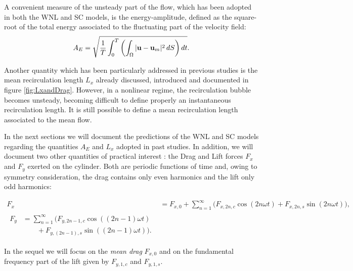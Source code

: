 \documentclass[twocolumn,10pt]{asme2ej}
\newcommand{\be}[1]{ \begin{equation} \label{#1}}
\newcommand{\ee}{\end{equation}}
\begin{document}
A convenient measure of the unsteady part of the flow, which has been adopted in both the WNL and SC models, is the energy-amplitude, defined as the square-root of the total energy associated to the fluctuating part of the velocity field:
\be{defAnergy}
A_E = \sqrt{\frac{1}{T} \int_0^{T} \left( \int_\Omega | {\bf u} - {\bf u}_m |^2 \, dS \right) dt}.
\ee

Another quantity which has been particularly addressed in previous studies is the mean recirculation length $L_x$
already discussed{\color{red},} introduced and {\color{red}documented in figure \ref{fig:LxandDrag}}. {\color{red} However, in a} nonlinear regime, the recirculation bubble becomes unsteady, {\color{red} becoming} difficult to define properly an instantaneous recirculation length. It is still possible to define a mean recirculation length associated to the mean flow. %

In the next sections we will document the predictions of the WNL and SC models regarding the quantities $A_E$ and $L_x$ adopted in past studies. In addition, we will document two other quantities of practical interest : the Drag and Lift forces $F_x$ and $F_y$ exerted on the cylinder. 
Both are periodic functions of time and{\color{red},} owing to symmetry consideration, the drag contains only even harmonics and the lift only odd harmonics:{\color{red}
\begin{align}
F_x &=F_{x,0} + \sum_{n=1}^\infty \big( F_{x,2n,c} \cos ( 2 n \omega t) + F_{x,2n,s} \sin( 2 n  \omega t ) \big),
\\
\begin{split}
F_y  & =\sum_{n=1}^\infty \big( F_{y,{2n-1},c} \cos ((2n-1) \omega t )\\
             &\qquad + F_{y,(2n-1),s}  \sin ((2n-1) \omega t) \big).
\end{split}
\label{drag_lift_def}
\end{align}



In the sequel we will focus on the {\em mean drag}  $F_{x,0}$ and on the fundamental frequency part of the lift given by $F_{y,1,c}$ and $F_{y,1,s}$.
 }
   
\end{document}
